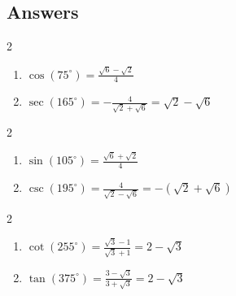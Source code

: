 \documentclass{ximera}
\begin{document}
	\author{Stitz-Zeager}



\subsection{Answers}

\begin{multicols}{2}

\begin{enumerate}

\addtocounter{enumi}{6}

\item  $\cos(75^{\circ}) = \frac{\sqrt{6} - \sqrt{2}}{4} $
\item  $\sec(165^{\circ}) = -\frac{4}{\sqrt{2}+\sqrt{6}} = \sqrt{2} - \sqrt{6}$

\setcounter{HW}{\value{enumi}}

\end{enumerate}

\end{multicols}

\begin{multicols}{2}

\begin{enumerate}

\setcounter{enumi}{\value{HW}}

\item  $\sin(105^{\circ}) = \frac{\sqrt{6}+\sqrt{2}}{4}$
\item  $\csc(195^{\circ}) = \frac{4}{\sqrt{2}-\sqrt{6}} = -(\sqrt{2}+\sqrt{6})$

\setcounter{HW}{\value{enumi}}

\end{enumerate}

\end{multicols}

\begin{multicols}{2}

\begin{enumerate}

\setcounter{enumi}{\value{HW}}

\item  $\cot(255^{\circ}) = \frac{\sqrt{3}-1}{\sqrt{3}+1} = 2-\sqrt{3}$
\item  $\tan(375^{\circ}) = \frac{3-\sqrt{3}}{3+\sqrt{3}} = 2-\sqrt{3}$

\setcounter{HW}{\value{enumi}}

\end{enumerate}

\end{multicols}
\end{document}
